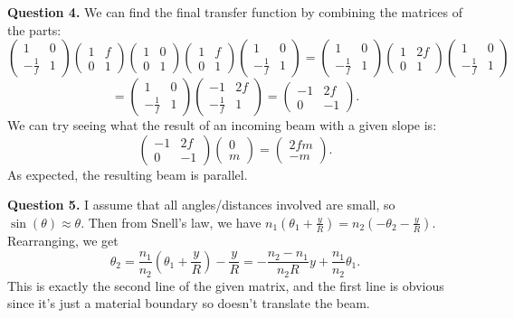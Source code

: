 \documentclass[letterpaper, reqno,11pt]{article}
\begin{document}
{\medskip\noindent\bf Question 4.} We can find the final transfer function by combining the matrices of the parts:
\[
    \begin{pmatrix} 1&0\\-\frac{1}{f}&1 \end{pmatrix} \begin{pmatrix} 1&f\\0&1 \end{pmatrix}\begin{pmatrix} 1&0\\0&1 \end{pmatrix} \begin{pmatrix} 1&f\\0&1 \end{pmatrix}\begin{pmatrix} 1&0\\-\frac{1}{f}&1 \end{pmatrix}=\begin{pmatrix} 1&0\\-\frac{1}{f}&1 \end{pmatrix} \begin{pmatrix}1&2f\\0&1\end{pmatrix}\begin{pmatrix} 1&0\\-\frac{1}{f}&1 \end{pmatrix} 
\]
\[
    =\begin{pmatrix} 1&0\\-\frac{1}{f}&1 \end{pmatrix}\begin{pmatrix} -1&2f\\-\frac{1}{f}&1 \end{pmatrix}=\begin{pmatrix} -1&2f\\0&-1 \end{pmatrix} 
.\]
We can try seeing what the result of an incoming beam with a given slope is:
\[
    \begin{pmatrix} -1&2f\\0&-1 \end{pmatrix}\begin{pmatrix} 0\\m \end{pmatrix} =\begin{pmatrix} 2fm\\ -m \end{pmatrix} 
.\]
As expected, the resulting beam is parallel.

{\medskip\noindent\bf Question 5.} I assume that all angles/distances involved are small, so $\sin(\theta)\approx\theta$. Then from Snell's law, we have $n_1\left( \theta_1+ \frac{y}{R} \right) =n_2\left( -\theta_2 - \frac{y}{R} \right) $. Rearranging, we get
\[
\theta_2= \frac{n_1}{n_2}\left( \theta_1+ \frac{y}{R} \right) -\frac{y}{R}= -\frac{n_2-n_1}{n_2R}y+ \frac{n_1}{n_2}\theta_1 
.\]
This is exactly the second line of the given matrix, and the first line is obvious since it's just a material boundary so doesn't translate the beam.
\end{document}
